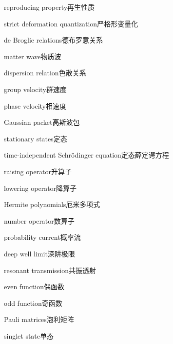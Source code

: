 \begin{multicols}{2}
reproducing property\hspace{0.9em}再生性质\par
strict deformation quantization\hspace{0.9em}严格形变量化\par
de Broglie relations\hspace{0.9em}德布罗意关系\par
matter wave\hspace{0.9em}物质波\par
dispersion relation\hspace{0.9em}色散关系\par
group velocity\hspace{0.9em}群速度\par
phase velocity\hspace{0.9em}相速度\par
Gaussian packet\hspace{0.9em}高斯波包\par
stationary states\hspace{0.9em}定态\par
time-independent Schrödinger equation\hspace{0.9em}定态薛定谔方程\par
raising operator\hspace{0.9em}升算子\par
lowering operator\hspace{0.9em}降算子\par
Hermite polynomials\hspace{0.9em}厄米多项式\par
number operator\hspace{0.9em}数算子\par
probability current\hspace{0.9em}概率流\par
deep well limit\hspace{0.9em}深阱极限\par
resonant transmission\hspace{0.9em}共振透射\par
even function\hspace{0.9em}偶函数\par
odd function\hspace{0.9em}奇函数\par
Pauli matrices\hspace{0.9em}泡利矩阵\par
singlet state\hspace{0.9em}单态\par

\end{multicols}
